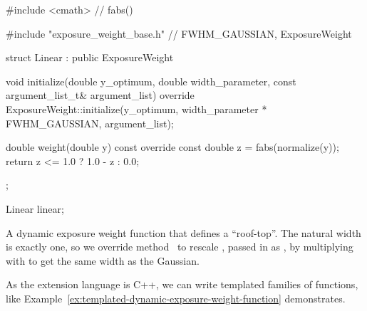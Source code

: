 \begin{exemplar}[htbp]
  \begin{maxipage}
    \begin{cxxlisting}
#include <cmath>                     // fabs()

#include "exposure_weight_base.h"    // FWHM_GAUSSIAN, ExposureWeight

struct Linear : public ExposureWeight {
    void initialize(double y_optimum, double width_parameter,
                    const argument_list_t& argument_list) override {
        ExposureWeight::initialize(y_optimum,
                                   width_parameter * FWHM_GAUSSIAN,
                                   argument_list);
    }

    double weight(double y) const override {
        const double z = fabs(normalize(y));
        return z <= 1.0 ? 1.0 - z : 0.0;
    }
};

Linear linear;
    \end{cxxlisting}
  \end{maxipage}

  \caption[Simple dynamic exposure weight function]{A dynamic exposure
    weight function that defines a ``roof-top''.  The natural width is
    exactly one, so we override method~ to rescale
    , passed in as , by
    multiplying with  to get the same width as
    the Gaussian.\label{ex:simple-dynamic-exposure-weight-function}}
\end{exemplar}


As the extension language is C++, we can write templated families of
functions, like
Example~\ref{ex:templated-dynamic-exposure-weight-function}
demonstrates.


